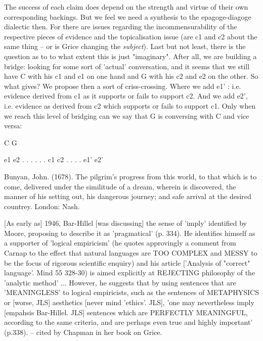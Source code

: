 \documentclass[10pt,titlepage]{book}
\begin{document}
{ The success of each claim does depend on the strength and virtue of  their 
own corresponding backings. But we feel we need a synthesis to the  
epagoge-diagoge dialectic then. For there are issues regarding the  
incommensurability of the respective pieces of evidence and the topicalisation  issue (are 
c1 and c2 about the same thing -- or is Grice changing the  {\it subject}). 
Last but not least, there is the question as to to what extent this  is just 
"imaginary". After all, we are building a bridge: looking for some sort  of 
'actual' conversation, and it seems that we still have C with his c1 and e1  
on one hand and G with his c2 and e2 on the other. So what gives? We propose  
then a sort of criss-crossing. Where we add e1' : i.e. evidence derived  
from c1 as it supports or fails to support c2. And we add e2', i.e.  evidence 
as derived from c2 which supports or fails to support c1.  Only when we 
reach this level of bridging can we say that G is  conversing with C and vice 
versa:
 
                    C                   G
 
  e1                                                e2
      .                                           .
        .                                     .
           .                               .
                c1                    c2
                   .                      .
                       .               .
                        e1'   e2'
 
 
Bunyan,  John. (1678). The pilgrim's progress from this world,  to that 
which is to come, delivered under  the similitude of a dream, wherein is 
discovered, the manner of his setting out,  his dangerous journey; and safe 
arrival at the desired countrey. London:  Nash.

[As early as] 1946, Bar-Hillel [was discussing] the sense of 'imply'  
identified by Moore, proposing to describe it as 'pragmatical' (p. 334).  He 
identifies himself as a supporter of 'logical empiricism' (he  quotes 
approvingly a comment from Carnap to the effect that  natural languages are TOO 
COMPLEX and MESSY to be the focus of rigorous  scientific enquiry) and his 
article ['Analysis of "correct"  language'. Mind 55 328-30) is aimed explicitly at 
REJECTING philosophy of  the 'analytic method' ... However, he suggests 
that by using sentences that are  'MEANINGLESS' to logical empiricists, such as 
the sentences of METAPHYSICS or  [worse, JLS] aesthetics [never mind 
'ethics'. JLS], 'one may nevertheless  imply [empahsis Bar-Hillel. JLS] 
sentences which are PERFECTLY MEANINGFUL,  according to the same criteria, and are 
perhaps even true and highly important'  (p.338). -- cited by Chapman in her 
book on Grice.

}
\end{document}

